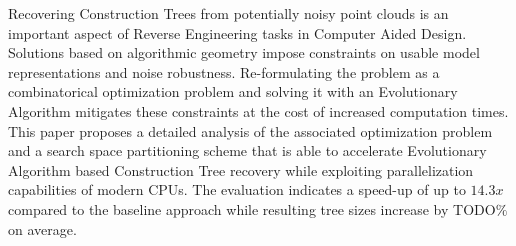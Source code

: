 Recovering Construction Trees from potentially noisy point clouds is an important aspect of Reverse Engineering tasks in Computer Aided Design. 
Solutions based on algorithmic geometry impose constraints on usable model representations and noise robustness. 
Re-formulating the problem as a combinatorical optimization problem and solving it with an Evolutionary Algorithm mitigates these constraints at the cost of increased computation times. 
This paper proposes a detailed analysis of the associated optimization problem and a search space partitioning scheme that is able to accelerate Evolutionary Algorithm based Construction Tree recovery while exploiting parallelization capabilities of modern CPUs.
The evaluation indicates a speed-up of up to $14.3x$ compared to the baseline approach while resulting tree sizes increase by TODO$\%$ on average.    
